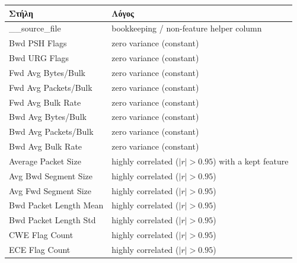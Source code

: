 \documentclass[12pt,a4paper,twoside]{book}
\begin{document}
\begin{table}[H]
    \centering
    \scriptsize
    \begin{tabular}{p{4.5cm}p{7.5cm}}
        \toprule
        \textbf{Στήλη}                  & \textbf{Λόγος}                                                  \\
        \midrule
        \_\_source\_file                & bookkeeping / non-feature helper column                         \\
        Bwd PSH Flags                   & zero variance (constant)                                        \\
        Bwd URG Flags                   & zero variance (constant)                                        \\
        Fwd Avg Bytes/Bulk              & zero variance (constant)                                        \\
        Fwd Avg Packets/Bulk            & zero variance (constant)                                        \\
        Fwd Avg Bulk Rate               & zero variance (constant)                                        \\
        Bwd Avg Bytes/Bulk              & zero variance (constant)                                        \\
        Bwd Avg Packets/Bulk            & zero variance (constant)                                        \\
        Bwd Avg Bulk Rate               & zero variance (constant)                                        \\
        Average Packet Size             & highly correlated (\(|r|>0.95\)) with a kept feature            \\
        Avg Bwd Segment Size            & highly correlated (\(|r|>0.95\))                                \\
        Avg Fwd Segment Size            & highly correlated (\(|r|>0.95\))                                \\
        Bwd Packet Length Mean          & highly correlated (\(|r|>0.95\))                                \\
        Bwd Packet Length Std           & highly correlated (\(|r|>0.95\))                                \\
        CWE Flag Count                  & highly correlated (\(|r|>0.95\))                                \\
        ECE Flag Count                  & highly correlated (\(|r|>0.95\))                                \\

\end{tabular}
\end{table}
\end{document}
